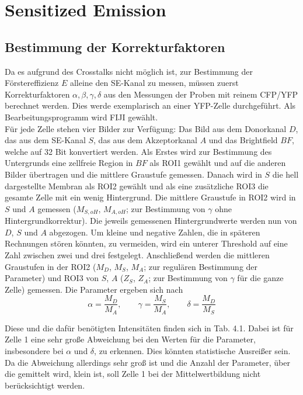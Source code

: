 

\section{Sensitized Emission}
\label{sec:SE}

\subsection{Bestimmung der Korrekturfaktoren}
\label{subs:korr}

Da es aufgrund des Crosstalks nicht möglich ist, zur Bestimmung der Förstereffizienz $E$ alleine den SE-Kanal zu messen, müssen zuerst 
Korrekturfaktoren $\alpha, \beta, \gamma, \delta$ aus den Messungen der Proben mit reinem CFP/YFP berechnet werden.
Dies werde exemplarisch an einer YFP-Zelle durchgeführt. Als Bearbeitungsprogramm wird FIJI gewählt. \footnotemark 
{}
\\
Für jede Zelle stehen vier Bilder zur Verfügung: Das Bild aus dem Donorkanal $D$, das aus dem SE-Kanal $S$, das aus dem 
Akzeptorkanal $A$ und das Brightfield $BF$, welche auf 32 Bit konvertiert werden. 
Als Erstes wird zur Bestimmung des Untergrunds eine zellfreie Region in $BF$ als ROI1 gewählt und 
auf die anderen Bilder übertragen und die mittlere Graustufe gemessen. Danach wird in $S$ die hell dargestellte Membran als ROI2 gewählt und 
als eine zusätzliche ROI3 die gesamte Zelle mit ein wenig Hintergrund. Die mittlere Graustufe in ROI2 wird in $S$ und $A$ gemessen 
($M_{S,oH}$, $M_{A,oH}$; zur 
Bestimmung von $\gamma$ ohne Hintergrundkorrektur). Die jeweils gemessenen Hintergrundwerte werden nun von $D$, $S$ und $A$ abgezogen. 
Um kleine und negative Zahlen, die in späteren Rechnungen stören könnten, zu vermeiden, wird ein unterer Threshold auf eine Zahl zwischen 
zwei und drei festgelegt. Anschließend werden die mittleren Graustufen in der ROI2 ($M_D$, $M_S$, $M_A$; zur regulären Bestimmung 
der Parameter) und ROI3 von $S$, $A$ ($Z_S$, $Z_A$; zur Bestimmung von $\gamma$ für die ganze Zelle) gemessen. Die Parameter ergeben 
sich nach
\begin{equation*}
    \alpha = \frac{M_D}{M_A}, \qquad
    \gamma = \frac{M_S}{M_A}, \qquad
    \delta = \frac{M_D}{M_S}
\end{equation*}

Diese und die dafür benötigten Intensitäten finden sich in Tab. 4.1. Dabei ist für Zelle 1 eine sehr große Abweichung bei den 
Werten für die Parameter, insbesondere bei $\alpha$ und $\delta$, zu erkennen. Dies könnten statistische Ausreißer sein. Da die Abweichung 
allerdings sehr groß ist und die Anzahl der Parameter, über die gemittelt wird, klein ist, soll Zelle 1 bei der Mittelwertbildung 
nicht berücksichtigt werden.

